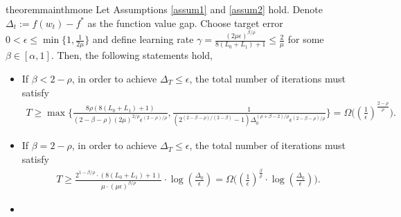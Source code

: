 \documentclass[10pt]{article} %
\begin{document}
\begin{restatable}[Convergence of AN-GD]{theorem}{mainthmone}\label{beta GD convergence}
    Let Assumptions \ref{assum1} and \ref{assum2} hold. Denote $\Delta_t:=f(w_t) - f^*$ as the function value gap. Choose target error $0< \epsilon\leq \min\{1,\frac{1}{2\mu}\}$ and define learning rate $\gamma = \frac{(2\mu\epsilon)^{\beta/\rho}}{8(L_0+L_1)+1}\leq \frac{2}{\mu}$ for some $\beta\in[\alpha,1]$. Then, the following statements hold,  
    \begin{itemize}[leftmargin = *]
        \item %
    If $\beta<2-\rho$, in order to achieve $\Delta_T\leq \epsilon$, 
    the total number of iterations must satisfy
    \begin{align}
    T \geq\max \Big\{\frac{8\rho(8(L_0+L_1)+1)}{(2-\beta-\rho)(2\mu)^{2/\rho}\epsilon^{(2-\rho)/{\rho}}}, \frac{1}{(2^{(2-\beta-\rho)/(2-\beta)}-1)\Delta_0^{{(\rho+\beta-2)}/{\rho}}\epsilon^{(2-\beta-\rho)/{\rho}}} \Big\}= \Omega \big((\frac{1}{\epsilon})^{\frac{2-\rho}{\rho}}\big).
    \end{align}
        \item %
        If $\beta=2-\rho$, in order to achieve $\Delta_{T}\leq \epsilon$,
        the total number of iterations must satisfy
        \begin{align}
        T\geq\frac{2^{1-\beta/\rho}\cdot(8(L_0+L_1)+1)}{\mu\cdot(\mu\epsilon)^{\beta/\rho}}\cdot\log(\frac{\Delta_0}{\epsilon})=\Omega\big((\frac{1}{\epsilon})^{\frac{\beta}{\rho}}\cdot \log(\frac{\Delta_0}{\epsilon})\big).
        \end{align}
        \item %

\end{itemize}
\end{restatable}
\end{document}
